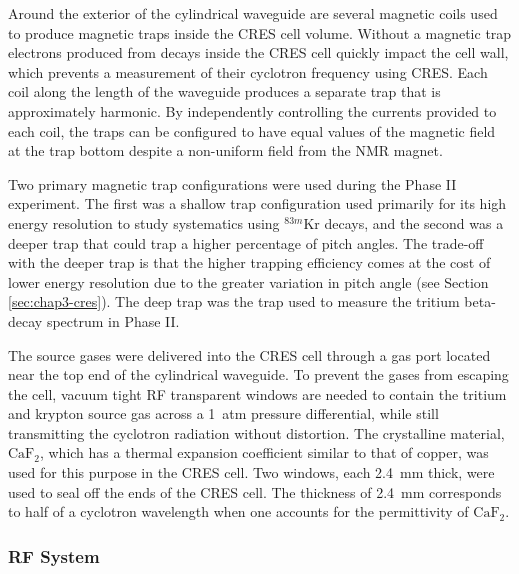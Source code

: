 Around the exterior of the cylindrical waveguide are several magnetic coils used to produce magnetic traps inside the CRES cell volume. Without a magnetic trap electrons produced from decays inside the CRES cell quickly impact the cell wall, which prevents a measurement of their cyclotron frequency using CRES. Each coil along the length of the waveguide produces a separate trap that is approximately harmonic. By independently controlling the currents provided to each coil, the traps can be configured to have equal values of the magnetic field at the trap bottom despite a non-uniform field from the NMR magnet. 

Two primary magnetic trap configurations were used during the Phase II experiment. The first was a shallow trap configuration used primarily for its high energy resolution to study systematics using $^{83m}$Kr decays, and the second was a deeper trap that could trap a higher percentage of pitch angles. The trade-off with the deeper trap is that the higher trapping efficiency comes at the cost of lower energy resolution due to the greater variation in pitch angle (see Section \ref{sec:chap3-cres}). The deep trap was the trap used to measure the tritium beta-decay spectrum in Phase II.

The source gases were delivered into the CRES cell through a gas port located near the top end of the cylindrical waveguide. To prevent the gases from escaping the cell, vacuum tight RF transparent windows are needed to contain the tritium and krypton source gas across a 1~atm pressure differential, while still transmitting the cyclotron radiation without distortion. The crystalline material, $\mathrm{CaF}_2$, which has a thermal expansion coefficient similar to that of copper, was used for this purpose in the CRES cell. Two windows, each 2.4~mm thick, were used to seal off the ends of the CRES cell. The thickness of 2.4~mm corresponds to half of a cyclotron wavelength when one accounts for the permittivity of $\mathrm{CaF}_2$.

\subsubsection*{RF System}

